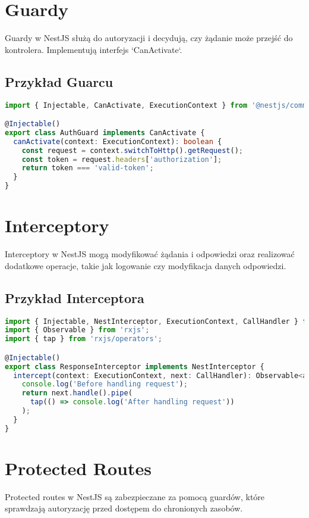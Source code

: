 \documentclass[a4paper,12pt]{article}
\begin{document}
\section{Guardy}
Guardy w NestJS służą do autoryzacji i decydują, czy żądanie może przejść do kontrolera. Implementują interfejs `CanActivate`.

\subsection{Przykład Guarcu}
\begin{lstlisting}[language=TypeScript, caption=Przykład guardu w NestJS]
import { Injectable, CanActivate, ExecutionContext } from '@nestjs/common';

@Injectable()
export class AuthGuard implements CanActivate {
  canActivate(context: ExecutionContext): boolean {
    const request = context.switchToHttp().getRequest();
    const token = request.headers['authorization'];
    return token === 'valid-token';
  }
}
\end{lstlisting}

\section{Interceptory}
Interceptory w NestJS mogą modyfikować żądania i odpowiedzi oraz realizować dodatkowe operacje, takie jak logowanie czy modyfikacja danych odpowiedzi.

\subsection{Przykład Interceptora}
\begin{lstlisting}[language=TypeScript, caption=Przykład interceptora w NestJS]
import { Injectable, NestInterceptor, ExecutionContext, CallHandler } from '@nestjs/common';
import { Observable } from 'rxjs';
import { tap } from 'rxjs/operators';

@Injectable()
export class ResponseInterceptor implements NestInterceptor {
  intercept(context: ExecutionContext, next: CallHandler): Observable<any> {
    console.log('Before handling request');
    return next.handle().pipe(
      tap(() => console.log('After handling request'))
    );
  }
}
\end{lstlisting}

\section{Protected Routes}
Protected routes w NestJS są zabezpieczane za pomocą guardów, które sprawdzają autoryzację przed dostępem do chronionych zasobów.
\end{document}

